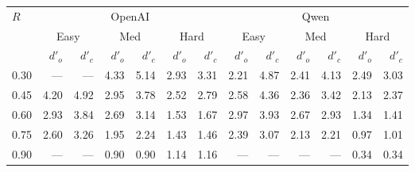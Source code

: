 \begin{tabular}{l*{12}{r}}
\toprule
  \multirow{2}{*}{$R$} & \multicolumn{6}{c}{OpenAI} & \multicolumn{6}{c}{Qwen} \\
  \cmidrule(lr){2-7} \cmidrule(lr){8-13}
  & \multicolumn{2}{c}{Easy} & \multicolumn{2}{c}{Med} & \multicolumn{2}{c}{Hard} & \multicolumn{2}{c}{Easy} & \multicolumn{2}{c}{Med} & \multicolumn{2}{c}{Hard} \\
  \cmidrule(lr){2-3} \cmidrule(lr){4-5} \cmidrule(lr){6-7} \cmidrule(lr){8-9} \cmidrule(lr){10-11} \cmidrule(lr){12-13}
  & $d'_o$ & $d'_c$ & $d'_o$ & $d'_c$ & $d'_o$ & $d'_c$ & $d'_o$ & $d'_c$ & $d'_o$ & $d'_c$ & $d'_o$ & $d'_c$ \\
\midrule
  0.30 & --- & --- & 4.33 & 5.14 & 2.93 & 3.31 & 2.21 & 4.87 & 2.41 & 4.13 & 2.49 & 3.03 \\
  0.45 & 4.20 & 4.92 & 2.95 & 3.78 & 2.52 & 2.79 & 2.58 & 4.36 & 2.36 & 3.42 & 2.13 & 2.37 \\
  0.60 & 2.93 & 3.84 & 2.69 & 3.14 & 1.53 & 1.67 & 2.97 & 3.93 & 2.67 & 2.93 & 1.34 & 1.41 \\
  0.75 & 2.60 & 3.26 & 1.95 & 2.24 & 1.43 & 1.46 & 2.39 & 3.07 & 2.13 & 2.21 & 0.97 & 1.01 \\
  0.90 & --- & --- & 0.90 & 0.90 & 1.14 & 1.16 & --- & --- & --- & --- & 0.34 & 0.34 \\
\bottomrule
\end{tabular}
